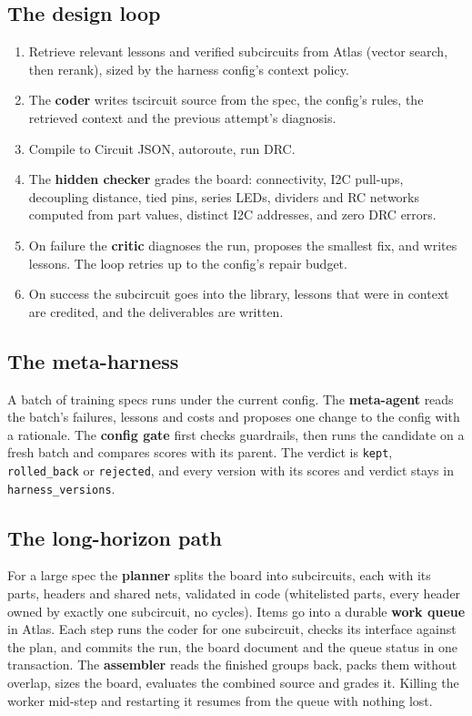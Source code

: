 \documentclass[11pt,a4paper]{article}
\newcommand{\code}[1]{\texttt{#1}}
\begin{document}
\subsection{The design loop}

\begin{enumerate}
  \item Retrieve relevant lessons and verified subcircuits from Atlas (vector search, then rerank), sized by the harness config's context policy.
  \item The \textbf{coder} writes tscircuit source from the spec, the config's rules, the retrieved context and the previous attempt's diagnosis.
  \item Compile to Circuit JSON, autoroute, run DRC.
  \item The \textbf{hidden checker} grades the board: connectivity, I2C pull-ups, decoupling distance, tied pins, series LEDs, dividers and RC networks computed from part values, distinct I2C addresses, and zero DRC errors.
  \item On failure the \textbf{critic} diagnoses the run, proposes the smallest fix, and writes lessons. The loop retries up to the config's repair budget.
  \item On success the subcircuit goes into the library, lessons that were in context are credited, and the deliverables are written.
\end{enumerate}

\subsection{The meta-harness}

A batch of training specs runs under the current config. The \textbf{meta-agent} reads the batch's failures, lessons and costs and proposes one change to the config with a rationale. The \textbf{config gate} first checks guardrails, then runs the candidate on a fresh batch and compares scores with its parent. The verdict is \code{kept}, \code{rolled\_back} or \code{rejected}, and every version with its scores and verdict stays in \code{harness\_versions}.

\subsection{The long-horizon path}

For a large spec the \textbf{planner} splits the board into subcircuits, each with its parts, headers and shared nets, validated in code (whitelisted parts, every header owned by exactly one subcircuit, no cycles). Items go into a durable \textbf{work queue} in Atlas. Each step runs the coder for one subcircuit, checks its interface against the plan, and commits the run, the board document and the queue status in one transaction. The \textbf{assembler} reads the finished groups back, packs them without overlap, sizes the board, evaluates the combined source and grades it. Killing the worker mid-step and restarting it resumes from the queue with nothing lost.
\end{document}
